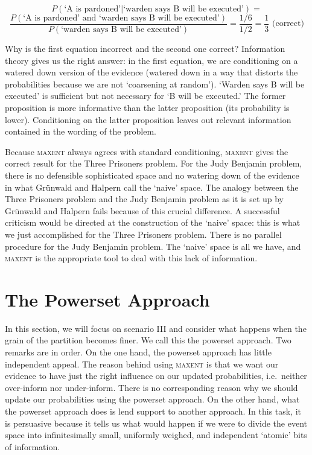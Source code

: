 \documentclass[smallextended]{svjour3}       %
\newcommand{\nial}{\noindent} %
\newcommand{\qnull}[1]{`#1'}
\begin{document}
\begin{displaymath}
  P(\mbox{`A is pardoned'}|\mbox{`warden says B will be
    executed'})=
\end{displaymath}
\begin{displaymath}
  \frac{P(\mbox{`A is pardoned' and `warden says B will
      be executed'})}{P(\mbox{`warden says B will be
      executed'})}=\frac{1/6}{1/2}=\frac{1}{3}\mbox{ (correct)}
\end{displaymath}

\nial Why is the first equation incorrect and the second one correct?
Information theory gives us the right answer: in the first equation,
we are conditioning on a watered down version of the evidence (watered
down in a way that distorts the probabilities because we are not
\qnull{coarsening at random}). \qnull{Warden says B will be executed}
is sufficient but not necessary for \qnull{B will be executed.} The
former proposition is more informative than the latter proposition
(its probability is lower). Conditioning on the latter proposition
leaves out relevant information contained in the wording of the
problem.

Because \textsc{maxent} always agrees with standard conditioning,
\textsc{maxent} gives the correct result for the Three Prisoners
problem. For the Judy Benjamin problem, there is no defensible
sophisticated space and no watering down of the evidence in what
Gr{\"u}nwald and Halpern call the \qnull{naive} space. The analogy
between the Three Prisoners problem and the Judy Benjamin problem as
it is set up by Gr{\"u}nwald and Halpern fails because of this crucial
difference. A successful criticism would be directed at the
construction of the \qnull{naive} space: this is what we just
accomplished for the Three Prisoners problem. There is no parallel
procedure for the Judy Benjamin problem. The \qnull{naive} space is
all we have, and \textsc{maxent} is the appropriate tool to deal with
this lack of information.

\section{The Powerset Approach}
\label{powerset}

In this section, we will focus on scenario III and consider what
happens when the grain of the partition becomes finer. We call this
the powerset approach. Two remarks are in order. On the one hand, the
powerset approach has little independent appeal. The reason behind
using \textsc{maxent} is that we want our evidence to have just the
right influence on our updated probabilities, i.e.\ neither
over-inform nor under-inform. There is no corresponding reason why we
should update our probabilities using the powerset approach. On the
other hand, what the powerset approach does is lend support to another
approach. In this task, it is persuasive because it tells us what
would happen if we were to divide the event space into infinitesimally
small, uniformly weighed, and independent \qnull{atomic} bits of
information.
\end{document}

